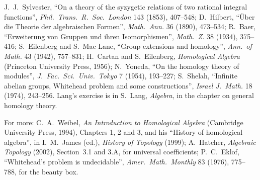 J.~J.~Sylvester, ``On a theory of the syzygetic relations of two rational integral functions'', \emph{Phil.\ Trans.\ R.\ Soc.\ London} 143 (1853), 407--548; D.~Hilbert, ``Über die Theorie der algebraischen Formen'', \emph{Math.\ Ann.} 36
(1890), 473--534; R.~Baer, ``Erweiterung von Gruppen und ihren Isomorphismen'', \emph{Math.\ Z.} 38 (1934), 375--416; S.~Eilenberg and S.~Mac Lane, ``Group extensions and homology'', \emph{Ann.\ of Math.} 43 (1942), 757--831;
H.~Cartan and S.~Eilenberg, \emph{Homological Algebra} (Princeton University Press, 1956); N.~Yoneda, ``On the homology theory of modules'', \emph{J.\ Fac.\ Sci.\ Univ.\ Tokyo} 7 (1954), 193--227; S.~Shelah, ``Infinite abelian groups,
Whitehead problem and some constructions'', \emph{Israel J.\ Math.} 18 (1974), 243--256. Lang's exercise is in S.~Lang, \emph{Algebra}, in the chapter on general homology theory.

For more: C.~A.~Weibel, \emph{An Introduction to Homological Algebra} (Cambridge University Press, 1994), Chapters 1, 2 and 3, and his ``History of homological algebra'', in I.~M.~James (ed.), \emph{History of Topology} (1999); A.~Hatcher, \emph{Algebraic
Topology} (2002), Section~3.1 and 3.A, for universal coefficients; P.~C.~Eklof, ``Whitehead's problem is undecidable'', \emph{Amer.\ Math.\ Monthly} 83 (1976), 775--788, for the beauty box.
